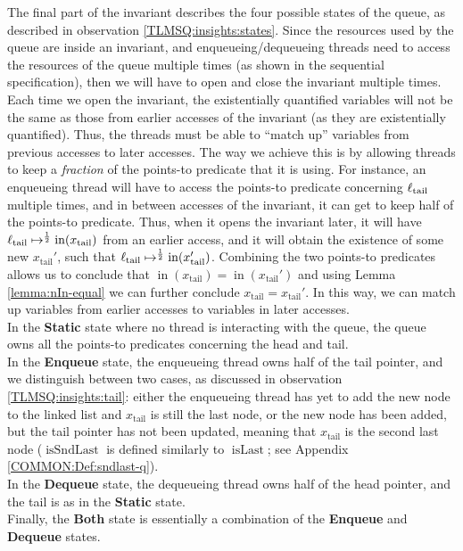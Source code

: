 \documentclass[a4paper, 10pt]{report}
\theoremstyle{definition}
\newcommand{\isLast}{\operatorname{isLast}}
\newcommand{\isSndLast}{\operatorname{isSndLast}}
\newcommand{\locN}[1]{\loc_{\mathrm{#1}}}
\newcommand{\loctail}{\locN{tail}}
\newcommand{\nIn}[1]{\operatorname{in}(#1)}
\newcommand{\node}{x}
\newcommand{\nodeN}[1]{\node_{\mathrm{#1}}}
\newcommand{\nodetail}{\nodeN{tail}}
\newcommand{\StaticState}{\textbf{Static}\xspace}
\newcommand{\EnqueueState}{\textbf{Enqueue}\xspace}
\newcommand{\DequeueState}{\textbf{Dequeue}\xspace}
\newcommand{\BothState}{\textbf{Both}\xspace}
\begin{document}
The final part of the invariant describes the four possible states of the queue, as described in observation \ref{TLMSQ:insights:states}. Since the resources used by the queue are inside an invariant, and enqueueing/dequeueing threads need to access the resources of the queue multiple times (as shown in the sequential specification), then we will have to open and close the invariant multiple times. Each time we open the invariant, the existentially quantified variables will not be the same as those from earlier accesses of the invariant (as they are existentially quantified). Thus, the threads must be able to ``match up'' variables from previous accesses to later accesses. The way we achieve this is by allowing threads to keep a \textit{fraction} of the points-to predicate that it is using. For instance, an enqueueing thread will have to access the points-to predicate concerning $\loctail$ multiple times, and in between accesses of the invariant, it can get to keep half of the points-to predicate. Thus, when it opens the invariant later, it will have $\loctail \mapsto^{\frac{1}{2}} \nIn{\nodetail}$ from an earlier access, and it will obtain the existence of some new $\nodetail'$, such that $\loctail \mapsto^{\frac{1}{2}} \nIn{\nodetail'}$. Combining the two points-to predicates allows us to conclude that $\nIn{\nodetail} = \nIn{\nodetail'}$ and using Lemma \ref{lemma:nIn-equal} we can further conclude $\nodetail = \nodetail'$. In this way, we can match up variables from earlier accesses to variables in later accesses.\\
In the \StaticState state where no thread is interacting with the queue, the queue owns all the points-to predicates concerning the head and tail.\\
In the \EnqueueState state, the enqueueing thread owns half of the tail pointer, and we distinguish between two cases, as discussed in observation \ref{TLMSQ:insights:tail}: either the enqueueing thread has yet to add the new node to the linked list and $\nodetail$ is still the last node, or the new node has been added, but the tail pointer has not been updated, meaning that $\nodetail$ is the second last node ($\isSndLast$ is defined similarly to $\isLast$; see Appendix \ref{COMMON:Def:sndlast-q}).\\
In the \DequeueState state, the dequeueing thread owns half of the head pointer, and the tail is as in the \StaticState state.\\
Finally, the \BothState state is essentially a combination of the \EnqueueState and \DequeueState states.
\end{document}
